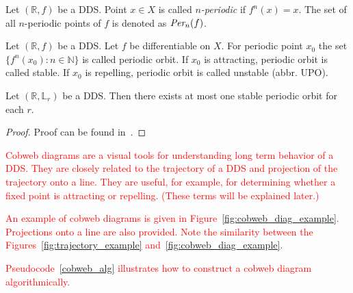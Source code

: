 \begin{definition}
    Let $\left( \mathbb{R}, f\right)$ be a DDS. Point $x \in X$ is called \emph{$n$-periodic} if $f^{n}(x)=x$.
    The set of all $n$-periodic points of $f$ is denoted as $\emph{Per}_{n}(f)$.~\cite{Devaney20211026}
\end{definition}

\begin{definition}
    Let $\left(\mathbb{R}, f\right)$ be a DDS. Let $f$ be differentiable on $X$. For periodic point $x_0$ the set $\{f^{n}(x_0):n \in \mathbb{N}\}$ is called periodic orbit.
    If $x_0$ is attracting, periodic orbit is called stable.
    If $x_0$ is repelling, periodic orbit is called unstable (abbr. UPO).
\end{definition}

\begin{theorem}
    Let $\left(\mathbb{R}, \mathbb{L}_r\right)$ be a DDS. Then there exists at most one stable periodic orbit for each $r$.~\cite[p.~74]{Devaney20211026}
\end{theorem}

\begin{proof}
    Proof can be found in~\cite[p.~74]{Devaney20211026}.
\end{proof}

\label{def:cobweb}
\begin{remark}
    \textcolor{red}{
    Cobweb diagrams are a visual tools for understanding long term behavior of a DDS.
    They are closely related to the trajectory of a DDS and projection of the trajectory onto a line.
    They are useful, for example, for determining whether a fixed point is attracting or repelling. (These terms will be explained later.)
    }
    \par
    \textcolor{red}{
    An example of cobweb diagrams is given in Figure~\ref{fig:cobweb_diag_example}.
    Projections onto a line are also provided.
    Note the similarity between the Figures~\ref{fig:trajectory_example} and~\ref{fig:cobweb_diag_example}.
    }
    \par
    \textcolor{red}{
    Pseudocode~\ref{cobweb_alg} illustrates how to construct a cobweb diagram algorithmically.
    }
\end{remark}

